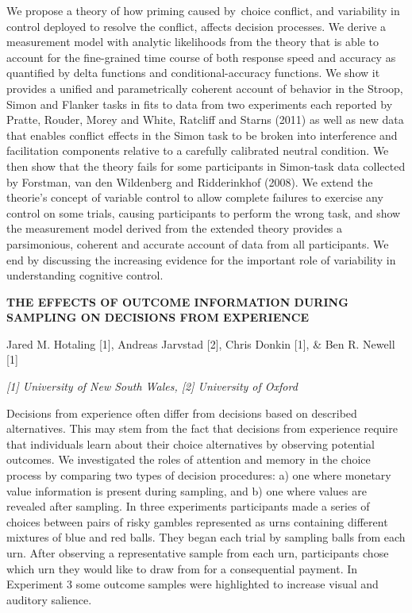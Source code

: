 \documentclass[]{article}
\begin{document}
We propose a theory of how priming caused by~choice conflict, and
variability in control deployed to resolve the conflict, affects
decision processes. We derive a measurement model with analytic
likelihoods from the theory that is able to account for the fine-grained
time course of both response speed and accuracy as quantified by delta
functions and conditional-accuracy functions. We show it provides a
unified and parametrically coherent account of behavior in the Stroop,
Simon and Flanker tasks in fits to data from two experiments each
reported by Pratte, Rouder, Morey and White, Ratcliff and Starns (2011)
as well as new data that enables conflict effects in the Simon task to
be broken into interference and facilitation components relative to a
carefully calibrated neutral condition. We then show that the theory
fails for some participants in Simon-task data collected by Forstman,
van den Wildenberg and Ridderinkhof (2008). We extend the theorie's
concept of variable control to allow complete failures to exercise any
control on some trials, causing participants to perform the wrong task,
and show the measurement model derived from the extended theory provides
a parsimonious, coherent and accurate account of data from all
participants. We end by discussing the increasing evidence for the
important role of variability in understanding cognitive control.

\textbf{THE EFFECTS OF OUTCOME INFORMATION DURING SAMPLING ON DECISIONS
FROM EXPERIENCE}

Jared M. Hotaling {[}1{]}, Andreas Jarvstad {[}2{]}, Chris Donkin
{[}1{]}, \& Ben R. Newell {[}1{]}

\emph{{[}1{]} University of New South Wales, {[}2{]} University of
Oxford}

Decisions from experience often differ from decisions based on described
alternatives. This may stem from the fact that decisions from experience
require that individuals learn about their choice alternatives by
observing potential outcomes. We investigated the roles of attention and
memory in the choice process by comparing two types of decision
procedures: a) one where monetary value information is present during
sampling, and b) one where values are revealed after sampling. In three
experiments participants made a series of choices between pairs of risky
gambles represented as urns containing different mixtures of blue and
red balls. They began each trial by sampling balls from each urn. After
observing a representative sample from each urn, participants chose
which urn they would like to draw from for a consequential payment. In
Experiment 3 some outcome samples were highlighted to increase visual
and auditory salience.
\end{document}
